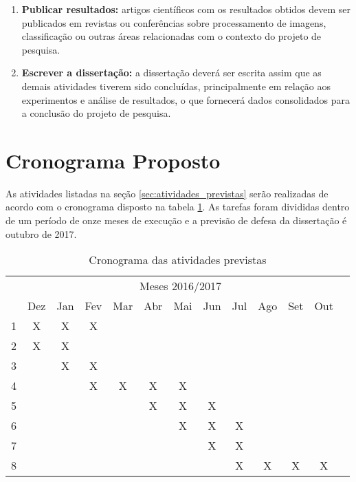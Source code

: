 \begin{enumerate}
    \item \textbf{Publicar resultados:} artigos científicos com os resultados obtidos devem ser publicados em revistas ou conferências sobre processamento de imagens, classificação ou outras áreas relacionadas com o contexto do projeto de pesquisa.

    \item \textbf{Escrever a dissertação:} a dissertação deverá ser escrita assim que as demais atividades tiverem sido concluídas, principalmente em relação aos experimentos e análise de resultados, o que fornecerá dados consolidados para a conclusão do projeto de pesquisa.
\end{enumerate}

\section{Cronograma Proposto}
\label{sec:cronograma}
As atividades listadas na seção \ref{sec:atividades_previstas} serão realizadas de acordo com o cronograma disposto na tabela \ref{tab:cronograma_proposto}. As tarefas foram divididas dentro de um período de onze meses de execução e a previsão de defesa da dissertação é outubro de 2017.

\begin{table}[!htpb]
\centering
\begin{small} 
  
\setlength{\tabcolsep}{6pt} 

\begin{tabular}{|c|c|c|c|c|c|c|c|c|c|c|c|c|}\hline
 & \multicolumn{11}{c|}{Meses 2016/2017}\\ \cline{2-12}
\raisebox{1.5ex}{Atividade} & Dez & Jan & Fev & Mar & Abr & Mai & Jun & Jul & Ago & Set & Out \\ \hline

1 & X & X & X &   &   &   &   &   &   &   & \\ \hline
2 & X & X &   &   &   &   &   &   &   &   & \\ \hline
3 &   & X & X &   &   &   &   &   &   &   & \\ \hline
4 &   &   & X & X & X & X &   &   &   &   & \\ \hline
5 &   &   &   &   & X & X & X &   &   &   & \\ \hline
6 &   &   &   &   &   & X & X & X &   &   & \\ \hline
7 &   &   &   &   &   &   & X & X &   &   & \\ \hline
8 &   &   &   &   &   &   &   & X & X & X & X \\ \hline

\end{tabular} 
\end{small}
\caption{Cronograma das atividades previstas}
\label{tab:cronograma_proposto}
\end{table}
